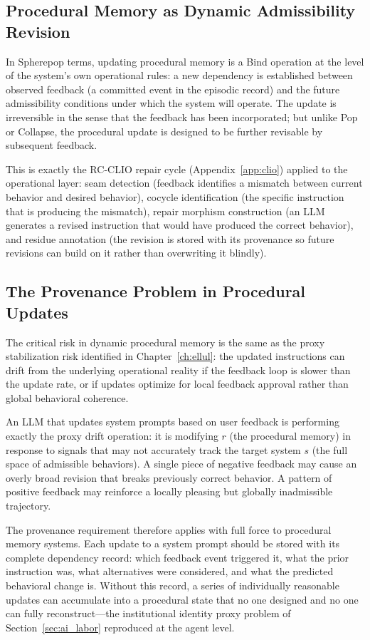 \subsection{Procedural Memory as Dynamic Admissibility Revision}

In Spherepop terms, updating procedural memory is a Bind operation at the
level of the system's own operational rules: a new dependency is established
between observed feedback (a committed event in the episodic record) and the
future admissibility conditions under which the system will operate. The update
is irreversible in the sense that the feedback has been incorporated; but unlike
Pop or Collapse, the procedural update is designed to be further revisable by
subsequent feedback.

\claimH This is exactly the RC-CLIO repair cycle (Appendix~\ref{app:clio})
applied to the operational layer: seam detection (feedback identifies a mismatch
between current behavior and desired behavior), cocycle identification (the
specific instruction that is producing the mismatch), repair morphism
construction (an LLM generates a revised instruction that would have produced
the correct behavior), and residue annotation (the revision is stored with its
provenance so future revisions can build on it rather than overwriting it blindly).

\subsection{The Provenance Problem in Procedural Updates}

The critical risk in dynamic procedural memory is the same as the proxy
stabilization risk identified in Chapter~\ref{ch:ellul}: the updated
instructions can drift from the underlying operational reality if the feedback
loop is slower than the update rate, or if updates optimize for local feedback
approval rather than global behavioral coherence.

\claimP An LLM that updates system prompts based on user feedback is performing
exactly the proxy drift operation: it is modifying $r$ (the procedural memory)
in response to signals that may not accurately track the target system $s$
(the full space of admissible behaviors). A single piece of negative feedback
may cause an overly broad revision that breaks previously correct behavior.
A pattern of positive feedback may reinforce a locally pleasing but globally
inadmissible trajectory.

The provenance requirement therefore applies with full force to procedural
memory systems. Each update to a system prompt should be stored with its
complete dependency record: which feedback event triggered it, what the
prior instruction was, what alternatives were considered, and what the
predicted behavioral change is. Without this record, a series of individually
reasonable updates can accumulate into a procedural state that no one
designed and no one can fully reconstruct---the institutional identity
proxy problem of Section~\ref{sec:ai_labor} reproduced at the
agent level.

